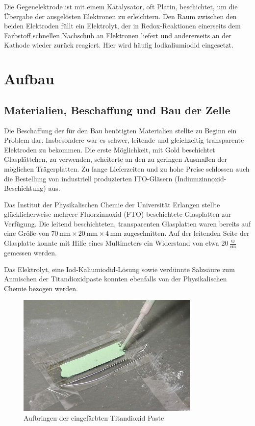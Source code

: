 \documentclass[11pt]{scrartcl}
\newcommand{\unit}[1]{\ensuremath{\,\mathrm{#1}}} %
\begin{document}
Die Gegenelektrode ist mit einem Katalysator, oft Platin, beschichtet, um die \"Ubergabe der ausgel\"osten Elektronen zu erleichtern. Den Raum zwischen den beiden Elektroden f\"ullt ein Elektrolyt, der in Redox-Reaktionen einerseits dem Farbstoff schnellen Nachschub an Elektronen liefert und andererseits an der Kathode wieder zur\"uck reagiert. Hier wird h\"aufig Iodkaliumiodid eingesetzt.





\section{Aufbau}
\subsection{Materialien, Beschaffung und Bau der Zelle}
Die Beschaffung der f\"ur den Bau ben\"otigten Materialien stellte zu Beginn ein Problem dar. Insbesondere war es schwer, leitende und gleichzeitig transparente Elektroden zu bekommen. Die erste M\"oglichkeit, mit Gold beschichtet Glaspl\"attchen, zu verwenden, scheiterte an den zu geringen Ausma\ss{}en der m\"oglichen Tr\"agerplatten. Zu lange Lieferzeiten und zu hohe Preise schlossen auch die Bestellung von industriell produzierten ITO-Gl\"asern (Indiumzinnoxid-Beschichtung) aus.

Das Institut der Physikalischen Chemie der Universit\"at Erlangen stellte gl\"ucklicherweise mehrere Fluorzinnoxid (FTO) beschichtete Glasplatten zur Verf\"ugung. Die leitend beschichteten, transparenten Glasplatten waren bereits auf eine Gr\"o\ss{}e von \(70\unit{mm} \times 20\unit{mm} \times 4 \unit{mm}\) zugeschnitten. Auf der leitenden Seite der Glasplatte konnte mit Hilfe eines Multimeters ein Widerstand von etwa \(20 \unit{\frac{\Omega}{cm}}\) gemessen werden.

Das Elektrolyt, eine Iod-Kaliumiodid-L\"osung sowie verd\"unnte Salzs\"aure zum Anmischen der Titandioxidpaste konnten ebenfalls von der Physikalischen Chemie bezogen werden.

\begin{figure}[ht]
\begin{center}
\includegraphics[width=0.8\textwidth]{images/herstellung_pipette.jpg}
\end{center}
\vspace{-1.5\baselineskip}
\caption{Aufbringen der eingefärbten Titandioxid Paste}
\label{herstellung_pipette}
\end{figure}
\end{document}

